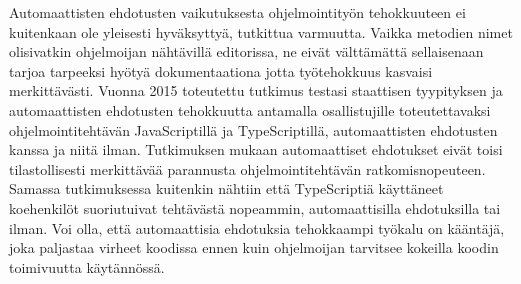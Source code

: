 Automaattisten ehdotusten vaikutuksesta ohjelmointityön tehokkuuteen ei
kuitenkaan ole yleisesti hyväksyttyä, tutkittua varmuutta. Vaikka metodien
nimet olisivatkin ohjelmoijan nähtävillä editorissa, ne eivät välttämättä
sellaisenaan tarjoa tarpeeksi hyötyä dokumentaationa jotta työtehokkuus
kasvaisi merkittävästi. Vuonna 2015 toteutettu tutkimus \cite{EmpiricalInvestigationOfCodeCompletion}
testasi staattisen tyypityksen ja automaattisten ehdotusten tehokkuutta
antamalla osallistujille toteutettavaksi ohjelmointitehtävän JavaScriptillä
ja TypeScriptillä, automaattisten ehdotusten kanssa ja niitä ilman. Tutkimuksen mukaan
automaattiset ehdotukset eivät toisi tilastollisesti merkittävää parannusta
ohjelmointitehtävän ratkomisnopeuteen. Samassa tutkimuksessa kuitenkin nähtiin
että TypeScriptiä käyttäneet koehenkilöt suoriutuivat tehtävästä nopeammin,
automaattisilla ehdotuksilla tai ilman. Voi olla, että automaattisia ehdotuksia
tehokkaampi työkalu on kääntäjä, joka paljastaa virheet koodissa ennen
kuin ohjelmoijan tarvitsee kokeilla koodin toimivuutta käytännössä.
